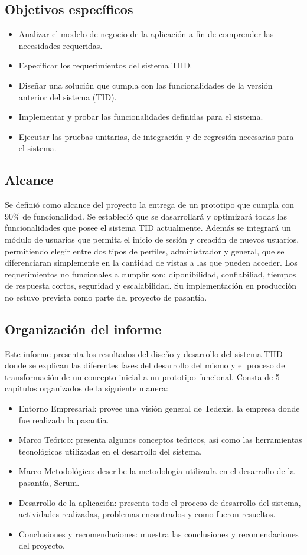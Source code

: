 \subsection*{Objetivos específicos}
\begin{itemize}[noitemsep,nolistsep]
\item Analizar el modelo de negocio de la aplicación a fin de comprender las necesidades requeridas.
\item Especificar los requerimientos del sistema TIID.
\item Diseñar una solución que cumpla con las funcionalidades de la versión anterior del sistema (TID).
\item Implementar y probar las funcionalidades definidas para el sistema.
\item Ejecutar las pruebas unitarias, de integración y de regresión necesarias para el sistema.
\end{itemize}

\subsection*{Alcance}
Se definió como alcance del proyecto la entrega de un prototipo que cumpla con 90\%
de funcionalidad. Se estableció que se dasarrollará y optimizará todas las funcionalidades que posee el sistema TID actualmente. Además se integrará un módulo de usuarios que permita el inicio de sesión y creación de nuevos usuarios, permitiendo elegir entre dos tipos de perfiles, administrador y general, que se diferenciaran simplemente en la cantidad de vistas a las que pueden acceder. Los requerimientos no funcionales a cumplir son: diponibilidad, confiabiliad, tiempos de respuesta cortos, seguridad y escalabilidad. Su implementación en producción no estuvo prevista como parte del proyecto de pasantía.

\subsection*{Organización del informe}
Este informe presenta los resultados del diseño y desarrollo del sistema TIID donde se explican las diferentes fases del desarrollo del mismo y el proceso de transformación de un concepto inicial a un prototipo funcional. Consta de 5 capítulos organizados de la siguiente manera:
\begin{itemize}[noitemsep,nolistsep]
\item Entorno Empresarial: provee una visión general de Tedexis, la empresa donde fue realizada la pasantia.
\item Marco Teórico: presenta algunos conceptos teóricos, así como las herramientas tecnológicas utilizadas en el desarrollo del sistema.
\item Marco Metodológico: describe la metodología utilizada en el desarrollo de la pasantía, Scrum.
\item Desarrollo de la aplicación: presenta todo el proceso de desarrollo del sistema, actividades realizadas, problemas encontrados y como fueron resueltos.
\item Conclusiones y recomendaciones: muestra las conclusiones y recomendaciones del proyecto.
\end{itemize}


